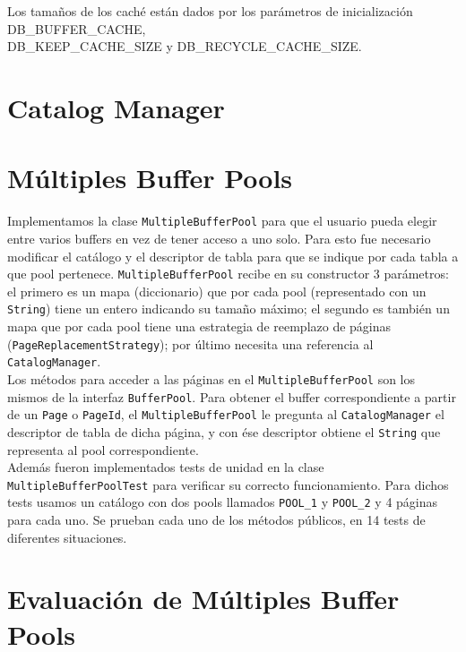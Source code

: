 \documentclass[a4paper,10pt]{article}
\begin{document}
Los tamaños de los caché están dados por los parámetros de inicialización DB\_BUFFER\_CACHE,\\DB\_KEEP\_CACHE\_SIZE y DB\_RECYCLE\_CACHE\_SIZE.


\newpage

\section{Catalog Manager}

\section{Múltiples Buffer Pools}
Implementamos la clase \texttt{MultipleBufferPool} para que el usuario pueda elegir entre varios buffers en vez de tener acceso a uno solo. Para esto fue necesario modificar el catálogo y el descriptor de tabla para que se indique por cada tabla a que pool pertenece. \texttt{MultipleBufferPool} recibe en su constructor 3 parámetros: el primero es un mapa (diccionario) que por cada pool (representado con un \texttt{String}) tiene un entero indicando su tamaño máximo; el segundo es también un mapa que por cada pool tiene una estrategia de reemplazo de páginas (\texttt{PageReplacementStrategy}); por último necesita una referencia al \texttt{CatalogManager}.\\

Los métodos para acceder a las páginas en el \texttt{MultipleBufferPool} son los mismos de la interfaz \texttt{BufferPool}. Para obtener el buffer correspondiente a partir de un \texttt{Page} o \texttt{PageId}, el \texttt{MultipleBufferPool} le pregunta al \texttt{CatalogManager} el descriptor de tabla de dicha página, y con ése descriptor obtiene el \texttt{String} que representa al pool correspondiente.\\

Además fueron implementados tests de unidad en la clase \texttt{MultipleBufferPoolTest} para verificar su correcto funcionamiento. Para dichos tests usamos un catálogo con dos pools llamados \texttt{POOL\_1} y \texttt{POOL\_2} y 4 páginas para cada uno. Se prueban cada uno de los métodos públicos, en 14 tests de diferentes situaciones.

\newpage

\section{Evaluación de Múltiples Buffer Pools}
\end{document}
